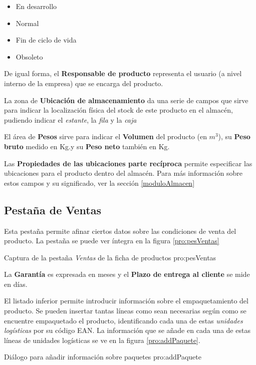 \begin{itemize}
\item En desarrollo
\item Normal
\item Fin de ciclo de vida
\item Obsoleto
\end{itemize}

De igual forma, el \textbf{Responsable de producto} representa el usuario (a nivel interno de la empresa) que se encarga del producto.

La zona de \textbf{Ubicación de almacenamiento} da una serie de campos que sirve para indicar la localización física del stock de este producto en el almacén, pudiendo indicar el \emph{estante}, la \emph{fila} y la \emph{caja}

El área de \textbf{Pesos} sirve para indicar el \textbf{Volumen} del producto (en $m^3$), su \textbf{Peso bruto} medido en Kg.y su \textbf{Peso neto} también en Kg.

Las \textbf{Propiedades de las ubicaciones parte recíproca} permite especificar las ubicaciones para el producto dentro del almacén. Para más información sobre estos campos y su significado, ver la sección \ref{moduloAlmacen}





\subsection{Pestaña de Ventas}

Esta pestaña permite afinar ciertos datos sobre las condiciones de venta del producto. La pestaña se puede ver íntegra en la figura \ref{pro:pesVentas} 

{Captura de la pestaña \emph{Ventas} de la ficha de productos}
{pro:pesVentas}

La \textbf{Garantía} es expresada en meses y el \textbf{Plazo de entrega al cliente} se mide en días.

El listado inferior permite introducir información sobre el empaquetamiento del producto. Se pueden insertar tantas líneas como sean necesarias según como se encuentre empaquetado el producto, identificando cada una de estas \emph{unidades logísticas} por su código EAN. La información que se añade en cada una de estas líneas de unidades logísticas se ve en la figura \ref{pro:addPaquete}.

{Diálogo para añadir información sobre paquetes}
{pro:addPaquete}

